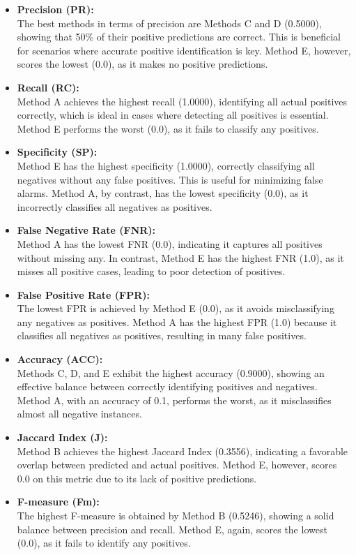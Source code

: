 \documentclass{article}
\begin{document}
\begin{itemize}
	\item \textbf{Precision (PR):} \\
	The best methods in terms of precision are Methods C and D (0.5000), showing that 50\% of their positive predictions are correct. This is beneficial for scenarios where accurate positive identification is key. Method E, however, scores the lowest (0.0), as it makes no positive predictions.
	
	\item \textbf{Recall (RC):} \\
	Method A achieves the highest recall (1.0000), identifying all actual positives correctly, which is ideal in cases where detecting all positives is essential. Method E performs the worst (0.0), as it fails to classify any positives.
	
	\item \textbf{Specificity (SP):} \\
	Method E has the highest specificity (1.0000), correctly classifying all negatives without any false positives. This is useful for minimizing false alarms. Method A, by contrast, has the lowest specificity (0.0), as it incorrectly classifies all negatives as positives.
	
	\item \textbf{False Negative Rate (FNR):} \\
	Method A has the lowest FNR (0.0), indicating it captures all positives without missing any. In contrast, Method E has the highest FNR (1.0), as it misses all positive cases, leading to poor detection of positives.
	
	\item \textbf{False Positive Rate (FPR):} \\
	The lowest FPR is achieved by Method E (0.0), as it avoids misclassifying any negatives as positives. Method A has the highest FPR (1.0) because it classifies all negatives as positives, resulting in many false positives.
	
	\item \textbf{Accuracy (ACC):} \\
	Methods C, D, and E exhibit the highest accuracy (0.9000), showing an effective balance between correctly identifying positives and negatives. Method A, with an accuracy of 0.1, performs the worst, as it misclassifies almost all negative instances.
	
	\item \textbf{Jaccard Index (J):} \\
	Method B achieves the highest Jaccard Index (0.3556), indicating a favorable overlap between predicted and actual positives. Method E, however, scores 0.0 on this metric due to its lack of positive predictions.
	
	\item \textbf{F-measure (Fm):} \\
	The highest F-measure is obtained by Method B (0.5246), showing a solid balance between precision and recall. Method E, again, scores the lowest (0.0), as it fails to identify any positives.
\end{itemize}
\end{document}
